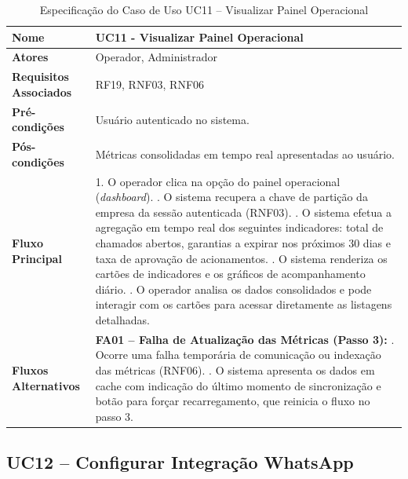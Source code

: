 \begin{table}[H]
	\centering
	\caption{Especificação do Caso de Uso UC11 – Visualizar Painel Operacional}
	\label{tab:uc11}
	\begin{tabular}{|p{3.5cm}|p{11.5cm}|}
		\hline
		\textbf{Nome} & UC11 - Visualizar Painel Operacional \\ \hline
		\textbf{Atores} & Operador, Administrador \\ \hline
		\textbf{Requisitos Associados} & RF19, RNF03, RNF06 \\ \hline
		\textbf{Pré-condições} & Usuário autenticado no sistema. \\ \hline
		\textbf{Pós-condições} & Métricas consolidadas em tempo real apresentadas ao usuário. \\ \hline
		\textbf{Fluxo Principal} & 
		1. O operador clica na opção do painel operacional (\textit{dashboard}). \newline
		2. O sistema recupera a chave de partição da empresa da sessão autenticada (RNF03). \newline
		3. O sistema efetua a agregação em tempo real dos seguintes indicadores: total de chamados abertos, garantias a expirar nos próximos 30 dias e taxa de aprovação de acionamentos. \newline
		4. O sistema renderiza os cartões de indicadores e os gráficos de acompanhamento diário. \newline
		5. O operador analisa os dados consolidados e pode interagir com os cartões para acessar diretamente as listagens detalhadas. \\ \hline
		\textbf{Fluxos Alternativos} & 
		\textbf{FA01 – Falha de Atualização das Métricas (Passo 3):} \newline
		1. Ocorre uma falha temporária de comunicação ou indexação das métricas (RNF06). \newline
		2. O sistema apresenta os dados em cache com indicação do último momento de sincronização e botão para forçar recarregamento, que reinicia o fluxo no passo 3. \\ \hline
	\end{tabular}
\end{table}

\subsection{UC12 – Configurar Integração WhatsApp}

